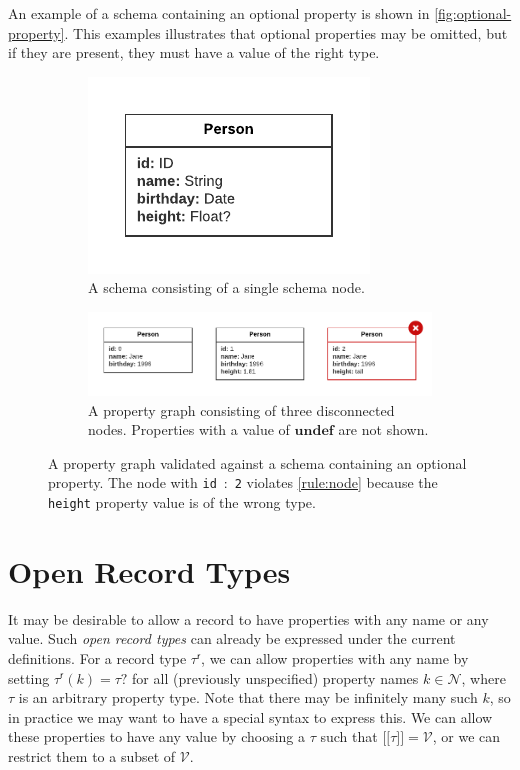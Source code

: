 \documentclass{report}
\theoremstyle{definition}
\newcommand{\ptype}{\tau}
\newcommand{\rtype}{\tau^\mathsf{r}}
\newcommand{\lsem}{\ensuremath{[\![}}
\newcommand{\rsem}{\ensuremath{]\!]}}
\newcommand{\sem}[1]{\ensuremath{\lsem #1 \rsem}}
\newcommand{\undefined}{\mathbf{undef}}
\begin{document}
An example of a schema containing an optional property is shown in \autoref{fig:optional-property}. This examples illustrates that optional properties may be omitted, but if they are present, they must have a value of the right type.

\begin{figure}[t]
  \centering
  \begin{subfigure}[t]{0.8\textwidth}
    \centering
    \includegraphics[scale=0.75]{figures/pg-schema-optional-prop.pdf}
    \caption{A schema consisting of a single schema node.}
  \end{subfigure}
  \hfill
  \begin{subfigure}[t]{0.8\textwidth}
    \centering
    \includegraphics[scale=0.75]{figures/conformance-optional-prop.pdf}
    \caption{A property graph consisting of three disconnected nodes. Properties with a value of $\undefined$ are not shown.}
  \end{subfigure}
  \caption[A property graph validated against a schema containing an optional property]{A property graph validated against a schema containing an optional property. The node with \texttt{id}~:~\texttt{2} violates \autoref{rule:node} because the \texttt{height} property value is of the wrong type.}
  \label{fig:optional-property}
\end{figure}

\section{Open Record Types}

It may be desirable to allow a record to have properties with any name or any value. Such \emph{open record types} can already be expressed under the current definitions. For a record type $\rtype$, we can allow properties with any name by setting $\rtype(k) = \ptype?$ for all (previously unspecified) property names $k \in \mathcal{N}$, where $\ptype$ is an arbitrary property type. Note that there may be infinitely many such $k$, so in practice we may want to have a special syntax to express this. We can allow these properties to have any value by choosing a $\ptype$ such that $\sem{\ptype} = \mathcal{V}$, or we can restrict them to a subset of $\mathcal{V}$.
\end{document}
